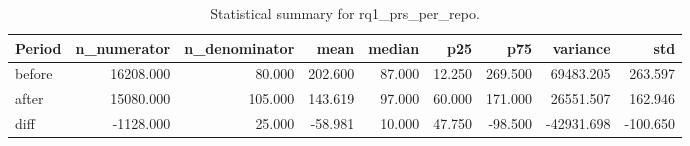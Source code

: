 \begin{table}[h]
\centering
\begin{tabular}{lrrrrrrrr}
\toprule
Period & n_numerator & n_denominator & mean & median & p25 & p75 & variance & std \\
\midrule
before & 16208.000 & 80.000 & 202.600 & 87.000 & 12.250 & 269.500 & 69483.205 & 263.597 \\
after & 15080.000 & 105.000 & 143.619 & 97.000 & 60.000 & 171.000 & 26551.507 & 162.946 \\
diff & -1128.000 & 25.000 & -58.981 & 10.000 & 47.750 & -98.500 & -42931.698 & -100.650 \\
\bottomrule
\end{tabular}
\caption{Statistical summary for rq1_prs_per_repo.}\label{tab:rq1_prs_per_repo}
\end{table}
